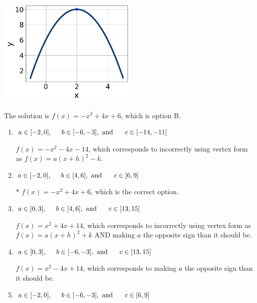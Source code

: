 \documentclass{extbook}[14pt]
\begin{document}
\begin{enumerate}
{\begin{center}
    \includegraphics[width=0.5\textwidth]{../Figures/quadraticGraphToEquationCopyB.png}
\end{center}



The solution is \( f(x) = -x^{2} +4 x + 6 \), which is option B.\begin{enumerate}[label=\Alph*.]
\item \( a \in [-2, 0], \hspace*{5mm} b \in [-6, -3], \text{ and } \hspace*{5mm} c \in [-14, -11] \)

$f(x)=-x^{2} -4 x -14$, which corresponds to incorrectly using vertex form as $f(x) = a(x+h)^2 - k$.
\item \( a \in [-2, 0], \hspace*{5mm} b \in [4, 6], \text{ and } \hspace*{5mm} c \in [6, 9] \)

* $f(x)=-x^{2} +4 x + 6$, which is the correct option.
\item \( a \in [0, 3], \hspace*{5mm} b \in [4, 6], \text{ and } \hspace*{5mm} c \in [13, 15] \)

$f(x)=x^{2} +4 x + 14$, which corresponds to incorrectly using vertex form as $f(x) = a(x+h)^2+k$ AND making $a$ the opposite sign than it should be.
\item \( a \in [0, 3], \hspace*{5mm} b \in [-6, -3], \text{ and } \hspace*{5mm} c \in [13, 15] \)

$f(x)=x^{2} -4 x + 14$, which corresponds to making $a$ the opposite sign than it should be.
\item \( a \in [-2, 0], \hspace*{5mm} b \in [-6, -3], \text{ and } \hspace*{5mm} c \in [6, 9] \)


\end{enumerate}}
\end{enumerate}
\end{document}
